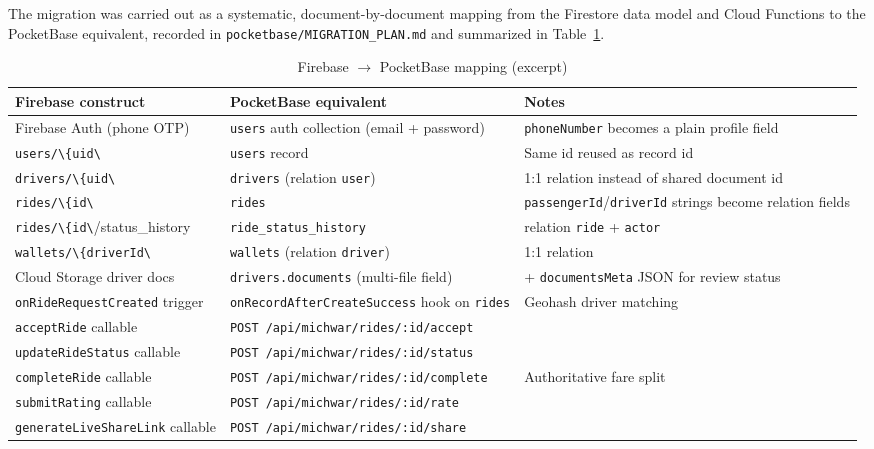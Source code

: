 \documentclass[11pt,a4paper]{article}
\newcommand{\code}[1]{\lstinline[basicstyle=\ttfamily\small]{#1}}
\begin{document}
The migration was carried out as a systematic, document-by-document mapping
from the Firestore data model and Cloud Functions to the PocketBase
equivalent, recorded in \texttt{pocketbase/MIGRATION\_PLAN.md} and summarized
in Table~\ref{tab:migration}.

\begin{table}[htbp]
\centering
\caption{Firebase $\rightarrow$ PocketBase mapping (excerpt)}
\label{tab:migration}
\begin{tabular}{@{}p{4.3cm}p{4.0cm}p{4.2cm}@{}}
\toprule
\textbf{Firebase construct} & \textbf{PocketBase equivalent} & \textbf{Notes} \\
\midrule
Firebase Auth (phone OTP) & \texttt{users} auth collection (email + password) & \texttt{phoneNumber} becomes a plain profile field \\
\code{users/\{uid\}} (Firestore) & \texttt{users} record & Same id reused as record id \\
\code{drivers/\{uid\}} & \texttt{drivers} (relation \texttt{user}) & 1:1 relation instead of shared document id \\
\code{rides/\{id\}} & \texttt{rides} & \texttt{passengerId}/\texttt{driverId} strings become relation fields \\
\code{rides/\{id\}/status\_history} & \texttt{ride\_status\_history} & relation \texttt{ride} + \texttt{actor} \\
\code{wallets/\{driverId\}} & \texttt{wallets} (relation \texttt{driver}) & 1:1 relation \\
Cloud Storage driver docs & \texttt{drivers.documents} (multi-file field) & + \texttt{documentsMeta} JSON for review status \\
\texttt{onRideRequestCreated} trigger & \texttt{onRecordAfterCreateSuccess} hook on \texttt{rides} & Geohash driver matching \\
\texttt{acceptRide} callable & \texttt{POST /api/michwar/rides/:id/accept} & \\
\texttt{updateRideStatus} callable & \texttt{POST /api/michwar/rides/:id/status} & \\
\texttt{completeRide} callable & \texttt{POST /api/michwar/rides/:id/complete} & Authoritative fare split \\
\texttt{submitRating} callable & \texttt{POST /api/michwar/rides/:id/rate} & \\
\texttt{generateLiveShareLink} callable & \texttt{POST /api/michwar/rides/:id/share} & \\
\bottomrule
\end{tabular}
\end{table}
\end{document}
